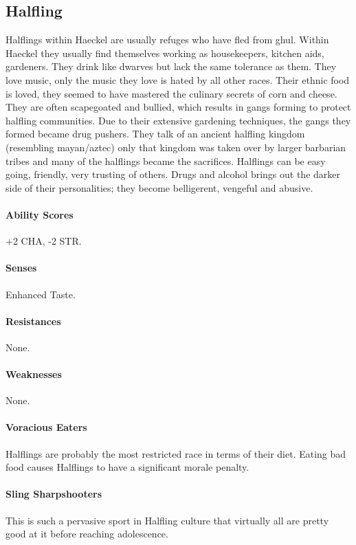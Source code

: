 \begin{multicols}{2}
\section{Halfling} Halflings within Haeckel are usually refuges who have fled from ghul. Within Haeckel they usually find themselves working as housekeepers, kitchen aids, gardeners. They drink like dwarves but lack the same tolerance as them. They love music, only the music they love is hated by all other races. Their ethnic food is loved, they seemed to have mastered the culinary secrets of corn and cheese. They are often scapegoated and bullied, which results in gangs forming to protect halfling communities. Due to their extensive gardening techniques, the gangs they formed became drug pushers. They talk of an ancient halfling kingdom (resembling mayan/aztec) only that kingdom was taken over by larger barbarian tribes and many of the halflings became the sacrifices. Halflings can be easy going, friendly, very trusting of others. Drugs and alcohol brings out the darker side of their personalities; they become belligerent, vengeful and abusive.

    \paragraph{Ability Scores} +2 CHA, -2 STR.
    \paragraph{Senses} Enhanced Taste.
    \paragraph{Resistances} None. 
    \paragraph{Weaknesses} None.
    \paragraph{Voracious Eaters} Halflings are probably the most restricted race in terms of their diet. Eating bad food causes Halflings to have a significant morale penalty. 
    \paragraph{Sling Sharpshooters} This is such a pervasive sport in Halfling culture that virtually all are pretty good at it before reaching adolescence. 


\end{multicols}
